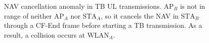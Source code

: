 \documentclass[comsoc]{IEEEtran}
\begin{document}
	\begin{figure}[ht!]
		\centering
		\begin{minipage}{\columnwidth}
			\centering
			\vbox{%
			\vfill	{}
			\vfill}
		\end{minipage}
		\begin{minipage}{\columnwidth}
			\centering
			\vbox{%
			\vfill
			\vfill}
		\end{minipage}
		\caption{NAV cancellation anomaly in TB UL transmissions. $\text{AP}_{B}$ is not in range of neither $\text{AP}_{A}$ nor $\text{STA}_{A}$, so it cancels the NAV in $\text{STA}_{B}$ through a CF-End frame before starting a TB transmission. As a result, a collision occurs at $\text{WLAN}_{A}$.}
		\label{fig:two_navs_issues}
	\end{figure}
	
\end{document}
